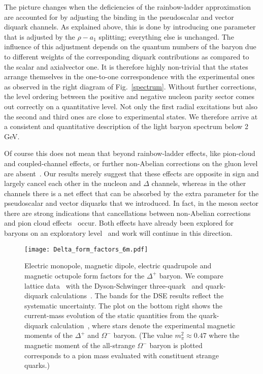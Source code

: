 \documentclass[epj,twocolumn]{webofc}
\begin{document}
The picture changes when the deficiencies of the rainbow-ladder approximation are accounted for by adjusting the binding in the
pseudoscalar and vector diquark channels. As explained above, this is done by introducing one parameter that is adjusted
by the $\rho-a_1$ splitting; everything else is unchanged. The influence of this adjustment depends on the quantum numbers of the baryon
due to different weights of the corresponding diquark contributions as compared to the scalar and axialvector one. It is therefore highly
non-trivial that the states arrange themselves in the one-to-one correspondence with the experimental ones as observed in the right
diagram of Fig.~\ref{spectrum}. Without further corrections, the level ordering between the positive and negative nucleon parity
sector comes out correctly on a quantitative level. Not only the first radial excitations but also the second and third ones are close
to experimental states. We therefore arrive at a consistent and quantitative description of the light baryon spectrum below 2 GeV.

Of course this does not mean that beyond rainbow-ladder effects, like pion-cloud and coupled-channel effects, or
further non-Abelian corrections on the gluon level are absent~\cite{Williams:2015cvx}. Our results merely suggest that these effects are opposite
in sign and largely cancel each other in the nucleon and $\Delta$ channels, whereas in the other channels there is a net effect that can be
absorbed by the extra parameter for the pseudoscalar and vector diquarks that we introduced. In fact, in the meson sector there
are strong indications that cancellations between non-Abelian corrections~\cite{Fischer:2009jm} and pion cloud effects~\cite{Fischer:2008wy}
occur. Both effects have already been explored for baryons on an exploratory level~\cite{Sanchis-Alepuz:2014wea,Sanchis-Alepuz:2015qra}
and work will continue in this direction.

        \begin{figure*}[t]
        \centering
\texttt{[image: Delta\_form\_factors\_6m.pdf]}
                    \caption{Electric monopole, magnetic dipole, electric quadrupole
and magnetic octupole form factors for the $\Delta^+$ baryon. We compare lattice data~\cite{Alexandrou:2009hs}
with the Dyson-Schwinger three-quark~\cite{Sanchis-Alepuz:2013iia} and quark-diquark calculations~\cite{Nicmorus:2010sd}.
The bands for the DSE results reflect the systematic uncertainty.
The plot on the bottom right shows the current-mass evolution of the static quantities from the quark-diquark calculation~\cite{Nicmorus:2010sd},
where stars denote the experimental magnetic moments of the $\Delta^+$ and $\Omega^-$ baryon. (The value $m_\pi^2 \approx 0.47$ where the magnetic 
moment of the all-strange $\Omega^-$ baryon is plotted corresponds to a pion mass evaluated with constituent strange quarks.)} \label{fig:delta-ffs}
        \end{figure*}
\end{document}
